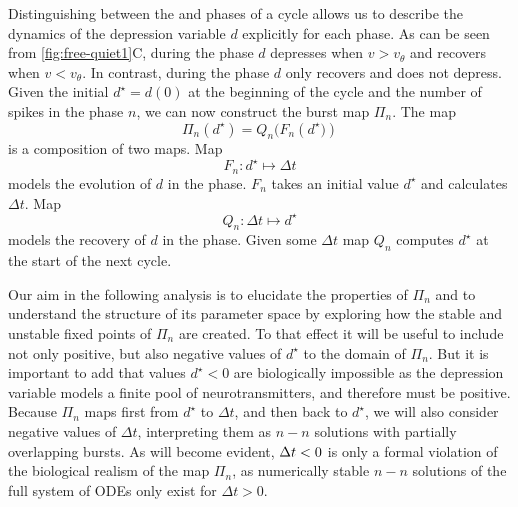 Distinguishing between the \free{} and \quiet{} phases of a cycle allows us to describe the dynamics of the depression variable \(d\) explicitly for each phase.
As can be seen from \cref{fig:free-quiet1}C, during the \free{} phase \(d\) depresses when $v > v_\theta$ and recovers when $v < v_\theta$.
In contrast, during the \quiet{} phase \(d\) only recovers and does not depress.
Given the initial \(d^{\star} = d(0)\) at the beginning of the cycle and the number of spikes in the \free{} phase \(n\), we can now construct the burst map \(\Pi_n\).
The map
\begin{equation}
	\Pi_n(d^\star)=Q_n\big(F_n(d^\star\big))
\end{equation}
\noindent
is a composition of two maps. Map
\begin{equation}
	F_n:d^\star\mapsto \Delta t
\end{equation}
models the evolution of \(d\) in the \free{} phase.
\(F_n\) takes an initial value \(d^{\star}\) and calculates \(\Delta t\).
Map
\begin{equation}
	Q_n:\Delta t \mapsto d^{\star}
\end{equation}
models the recovery of \(d\) in the \quiet{} phase.
Given some \(\Delta t\) map \(Q_n\) computes \(d^\star\) at the start of the next cycle.

Our aim in the following analysis is to elucidate the properties of \(\Pi_n\) and to understand the structure of its parameter space by exploring how the stable and unstable fixed points of \(\Pi_{n}\) are created.
To that effect it will be useful to include not only positive, but also negative values of \(d^{\star}\) to the domain of \(\Pi_{n}\).
But it is important to add that values \(d^{\star}<0\) are biologically impossible as the depression variable models a finite pool of neurotransmitters, and therefore must be positive.
Because \(\Pi_{n}\) maps first from \(d^{\star}\) to \(\Delta t\), and then back to \(d^{\star}\), we will also consider negative values of \(\Delta t\), interpreting them as \(n-n\) solutions with partially overlapping bursts.
As will become evident, \(\Delta t<0\) is only a formal violation of the biological realism of the map \(\Pi_{n}\), as numerically stable \(n-n\) solutions of the full system of ODEs only exist for \(\Delta t>0\).

